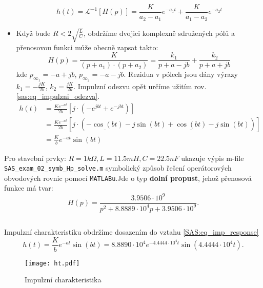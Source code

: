\begin{example}
\begin{itemize}
\begin{equation}
              h(t)=\mathcal{L}^{-1}[H(p)]=\frac{K}{a_2-a_1}e^{-a_1t}+\frac{K}{a_1-a_2}e^{-a_2t}
            \end{equation}
      \item Když bude $R<2\sqrt{\frac{L}{C}}$, obdržíme dvojici komplexně sdružených pólů a
            pře\-no\-so\-vou funkci může obecně zapsat takto:
            \begin{equation}\label{sas:eq_ht2}
              H(p)=\frac{K}{(p+a_1)\cdot(p+a_2)}=\frac{k_1}{p+a-jb}+\frac{k_2}{p+a+jb}
            \end{equation}
            kde $p_{\infty_1}=-a+jb$, $p_{\infty_2}=-a-jb$. Rezidua v pólech jsou dány výrazy
            $k_1=-\frac{jK}{2b}$, $k_2=\frac{jK}{2b}$. Impulzní odezvu opět určíme užitím rov.
            \ref{sas:eq_impulzni_odezva}.
          \begin{align}\label{SAS:eq_imp_response}
             h(t) &= \frac{Ke^{-at}}{2b}\left[j\cdot
                     \left(-e^{jbt}+e^{-jbt}\right)\right]                               \nonumber\\
              \,  &= \frac{Ke^{-at}}{2b}\left[j\cdot
                     \left(\underline{-\cos(bt)}-j\sin(bt)+
                     \underline{\cos(bt)}-j\sin(bt)\right)\right]                        \nonumber\\
              \,  &= \frac{K}{b}e^{-at}\sin(bt)                          
          \end{align}
    \end{itemize}
    
    Pro stavební prvky: $R=1k\Omega, L=11.5mH, C=22.5nF$ ukazuje výpis m-file
    \texttt{SAS\_exam\_02\_symb\_Hp\_solve.m} symbolický způsob řešení operátorových
    ob\-vo\-do\-vých rovnic pomocí \texttt{MATLABu}.Jde o typ \textbf{dolní propust}, jehož
    přenosová funkce má tvar: $$H(p)=
    \frac{3.9506\cdot10^9}{p^2+8.8889\cdot10^4p+3.9506\cdot10^9}.$$
    
    \begin{lstlisting}[caption=SAS\_exam\_02\_symb\_Hp\_solve.m]
    \end{lstlisting}
    Impulzní charakteristiku obdržíme dosazením do vztahu \ref{SAS:eq_imp_response}
    $$h(t)=\frac{K}{b}e^{-at}\sin(bt) 
          =8.8890\cdot10^4e^{-4.4444\cdot10^4t}\sin(4.4444\cdot10^4t).$$

    \begin{figure}[ht!]
       \centering
       \texttt{[image: ht.pdf]}
       \caption{Impulzní charakteristika}
    \end{figure}
    

\end{example}
